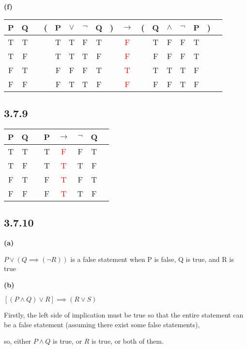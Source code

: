 \documentclass{article}
\begin{document}
\textbf{(f)}

\begin{tabular}{@{ }c@{ }@{ }c | c@{ }@{}c@{}@{ }c@{ }@{ }c@{ }@{ }c@{ }@{ }c@{ }@{}c@{}@{ }c@{ }@{}c@{}@{ }c@{ }@{ }c@{ }@{ }c@{ }@{ }c@{ }@{}c@{}@{ }c}
P & Q &  & ( & P & $\lor$ & $\lnot$ & Q & ) & $\rightarrow$ & ( & Q & $\land$ & $\lnot$ & P & ) & \\
\hline 
T & T &  &  & T & T & F & T &  & \textcolor{red}{F} &  & T & F & F & T &  & \\
T & F &  &  & T & T & T & F &  & \textcolor{red}{F} &  & F & F & F & T &  & \\
F & T &  &  & F & F & F & T &  & \textcolor{red}{T} &  & T & T & T & F &  & \\
F & F &  &  & F & T & T & F &  & \textcolor{red}{F} &  & F & F & T & F &  & \\
\end{tabular}

\subsection*{3.7.9}

\begin{tabular}{@{ }c@{ }@{ }c | c@{ }@{ }c@{ }@{ }c@{ }@{ }c@{ }@{ }c@{ }@{ }c}
P & Q &  & P & $\rightarrow$ & $\lnot$ & Q & \\
\hline 
T & T &  & T & \textcolor{red}{F} & F & T & \\
T & F &  & T & \textcolor{red}{T} & T & F & \\
F & T &  & F & \textcolor{red}{T} & F & T & \\
F & F &  & F & \textcolor{red}{T} & T & F & \\
\end{tabular}

\subsection*{3.7.10}

\textbf{(a)}

$P\lor (Q\implies (\neg R))$ is a false statement when P is false, Q is true, and R is true

\textbf{(b)}

$[(P\land Q)\lor R]\implies (R\lor S)$ 

Firstly, the left side of implication must be true so that the entire statement can be a false statement (assuming there exist some false statements),

so, either $P\land Q$ is true, or $R$ is true, or both of them.
\end{document}
